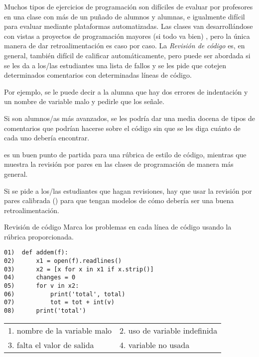 
Muchos tipos de ejercicios de programación son difíciles de evaluar por profesores en una clase con más de un puñado de alumnos y alumnas, e igualmente difícil para evaluar mediante plataformas automatizadas.
Las clases van desarrollándose con vistas a proyectos de programación mayores (si todo va bien) , 
pero la única manera de dar retroalimentación es caso por caso.
La \emph{Revisión de código} es, en general, también  difícil de calificar automáticamente,
pero puede ser abordada si se les da a los/las estudiantes una lista de fallos y se les pide que cotejen determinados comentarios con determinadas líneas de código.

Por ejemplo, 
se le puede decir a la alumna que hay dos errores de indentación y un nombre de variable malo y pedirle que los señale.

Si son alumnos/as más avanzados, se les podría dar una media docena de tipos de comentarios que podrían hacerse sobre el código sin que se les diga cuánto de cada uno debería encontrar.

\cite{Steg2016b} es un buen punto de partida para una rúbrica de estilo de código, mientras que~\cite{Luxt2009} muestra la revisión por pares en las clases de programación de manera más general.

Si se pide a los/las estudiantes que hagan revisiones, hay que usar la revisión por pares calibrada () para que tengan modelos de cómo debería ser una buena retroalimentación.

\begin{aside}{Revisión de código}
 Marca los problemas en cada línea de código usando la rúbrica proporcionada.

\begin{verbatim}
01)  def addem(f):
02)      x1 = open(f).readlines()
03)      x2 = [x for x in x1 if x.strip()]
04)      changes = 0
05)      for v in x2:
06)          print('total', total)
07)          tot = tot + int(v)
08)      print('total')
\end{verbatim}

   \begin{longtable}{ll}
    1. nombre de la variable malo   & 2. uso de variable indefinida \\
    3. falta el valor de salida & 4. variable no usada
  \end{longtable}

\end{aside}

